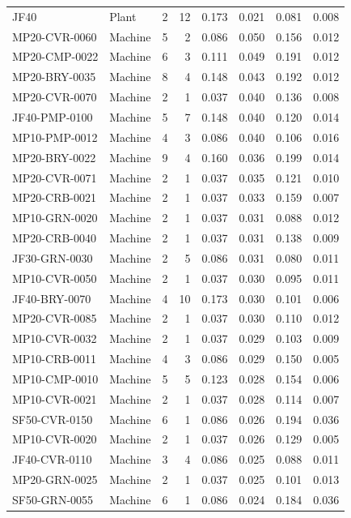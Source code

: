 \begin{longtable}{l l r r r r r r}
JF40 & Plant & 2 & 12 & 0.173 & 0.021 & 0.081 & 0.008\\
MP20-CVR-0060 & Machine & 5 & 2 & 0.086 & 0.050 & 0.156 & 0.012\\
MP20-CMP-0022 & Machine & 6 & 3 & 0.111 & 0.049 & 0.191 & 0.012\\
MP20-BRY-0035 & Machine & 8 & 4 & 0.148 & 0.043 & 0.192 & 0.012\\
MP20-CVR-0070 & Machine & 2 & 1 & 0.037 & 0.040 & 0.136 & 0.008\\
JF40-PMP-0100 & Machine & 5 & 7 & 0.148 & 0.040 & 0.120 & 0.014\\
MP10-PMP-0012 & Machine & 4 & 3 & 0.086 & 0.040 & 0.106 & 0.016\\
MP20-BRY-0022 & Machine & 9 & 4 & 0.160 & 0.036 & 0.199 & 0.014\\
MP20-CVR-0071 & Machine & 2 & 1 & 0.037 & 0.035 & 0.121 & 0.010\\
MP20-CRB-0021 & Machine & 2 & 1 & 0.037 & 0.033 & 0.159 & 0.007\\
MP10-GRN-0020 & Machine & 2 & 1 & 0.037 & 0.031 & 0.088 & 0.012\\
MP20-CRB-0040 & Machine & 2 & 1 & 0.037 & 0.031 & 0.138 & 0.009\\
JF30-GRN-0030 & Machine & 2 & 5 & 0.086 & 0.031 & 0.080 & 0.011\\
MP10-CVR-0050 & Machine & 2 & 1 & 0.037 & 0.030 & 0.095 & 0.011\\
JF40-BRY-0070 & Machine & 4 & 10 & 0.173 & 0.030 & 0.101 & 0.006\\
MP20-CVR-0085 & Machine & 2 & 1 & 0.037 & 0.030 & 0.110 & 0.012\\
MP10-CVR-0032 & Machine & 2 & 1 & 0.037 & 0.029 & 0.103 & 0.009\\
MP10-CRB-0011 & Machine & 4 & 3 & 0.086 & 0.029 & 0.150 & 0.005\\
MP10-CMP-0010 & Machine & 5 & 5 & 0.123 & 0.028 & 0.154 & 0.006\\
MP10-CVR-0021 & Machine & 2 & 1 & 0.037 & 0.028 & 0.114 & 0.007\\
SF50-CVR-0150 & Machine & 6 & 1 & 0.086 & 0.026 & 0.194 & 0.036\\
MP10-CVR-0020 & Machine & 2 & 1 & 0.037 & 0.026 & 0.129 & 0.005\\
JF40-CVR-0110 & Machine & 3 & 4 & 0.086 & 0.025 & 0.088 & 0.011\\
MP20-GRN-0025 & Machine & 2 & 1 & 0.037 & 0.025 & 0.101 & 0.013\\
SF50-GRN-0055 & Machine & 6 & 1 & 0.086 & 0.024 & 0.184 & 0.036\\

\end{longtable}
